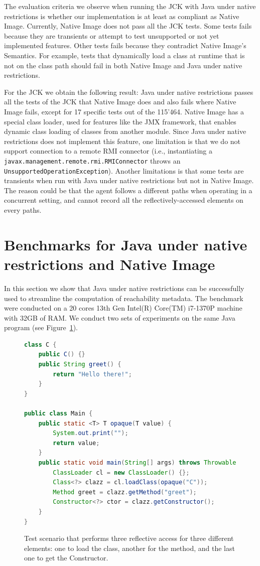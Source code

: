 The evaluation criteria we observe when running the JCK with Java under native restrictions is whether our implementation is at least as compliant as Native Image. Currently, Native Image does not pass all the JCK tests. Some tests fails because they are transients or attempt to test unsupported or not yet implemented features. Other tests fails because they contradict Native Image's Semantics. For example, tests that dynamically load a class at runtime that is not on the class path should fail in both Native Image and Java under native restrictions. 

For the JCK we obtain the following result: Java under native restrictions passes all the tests of the JCK that Native Image does and also fails where Native Image fails, except for 17 specific tests out of the 115'464. Native Image has a special class loader, used for features like the JMX framework, that enables dynamic class loading of classes from another module. Since Java under native restrictions does not implement this feature, one limitation is that we do not support connection to a remote RMI connector (i.e., instantiating a \verb|javax.management.remote.rmi.RMIConnector| throws an \verb|UnsupportedOperationException|). 
Another limitations is that some tests are transients when run with Java under native restrictions but not in Native Image. The reason could be that the agent follows a different paths when operating in a concurrent setting, and cannot record all the reflectively-accessed elements on every paths. 

\section{Benchmarks for Java under native restrictions and Native Image}\label{benchmark}
In this section we show that Java under native restrictions can be successfully used to streamline the computation of reachability metadata. The benchmark were conducted on a 20 cores 13th Gen Intel(R) Core(TM) i7-1370P machine with 32GB of RAM. We conduct two sets of experiments on the same Java program (see Figure~\ref{fig:benchmark}). 

\begin{figure}[ht]
    \centering
\begin{lstlisting}[language=Java]
class C {
    public C() {}
    public String greet() {
        return "Hello there!";
    }
}

public class Main {
    public static <T> T opaque(T value) {
        System.out.print("");
        return value;
    }
    public static void main(String[] args) throws Throwable {
        ClassLoader cl = new ClassLoader() {};
        Class<?> clazz = cl.loadClass(opaque("C"));
        Method greet = clazz.getMethod("greet");
        Constructor<?> ctor = clazz.getConstructor();
    }
}
\end{lstlisting}
    \caption{Test scenario that performs three reflective access for three different elements: one to load the class, another for the method, and the last one to get the Constructor.}
    \label{fig:benchmark}
\end{figure}

